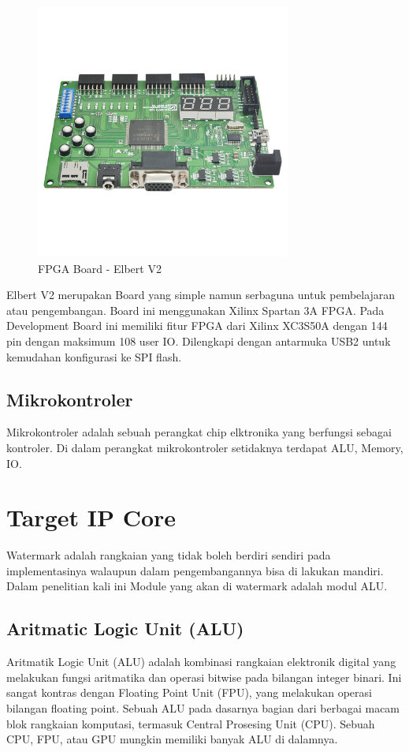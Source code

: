 \begin{figure}
	\centering
	\includegraphics[width=0.75\textwidth]
	{pics/elbertv2.jpg}
	\caption{FPGA Board - Elbert V2}
	\label{fig:fpga}
\end{figure}

Elbert V2 merupakan Board yang simple namun serbaguna untuk pembelajaran atau pengembangan. Board ini menggunakan Xilinx Spartan 3A FPGA. Pada Development Board ini memiliki fitur FPGA dari Xilinx XC3S50A dengan 144 pin dengan maksimum 108 user IO. Dilengkapi dengan antarmuka USB2 untuk kemudahan konfigurasi ke SPI flash. 

\subsection{Mikrokontroler}
Mikrokontroler adalah sebuah perangkat chip elktronika yang berfungsi sebagai kontroler. Di dalam perangkat mikrokontroler setidaknya terdapat ALU, Memory, IO.

\section{Target IP Core}
Watermark adalah rangkaian yang tidak boleh berdiri sendiri pada implementasinya walaupun dalam pengembangannya bisa di lakukan mandiri. Dalam penelitian kali ini Module yang akan di watermark adalah modul ALU.

\subsection{Aritmatic Logic Unit (ALU)}
Aritmatik Logic Unit (ALU) adalah kombinasi rangkaian elektronik digital yang melakukan fungsi aritmatika dan operasi bitwise pada bilangan integer binari. Ini sangat kontras dengan Floating Point Unit (FPU), yang melakukan operasi bilangan floating point. Sebuah ALU pada dasarnya bagian dari berbagai macam blok rangkaian komputasi, termasuk Central Prosesing Unit (CPU). Sebuah CPU, FPU, atau GPU mungkin memiliki banyak ALU di dalamnya.

